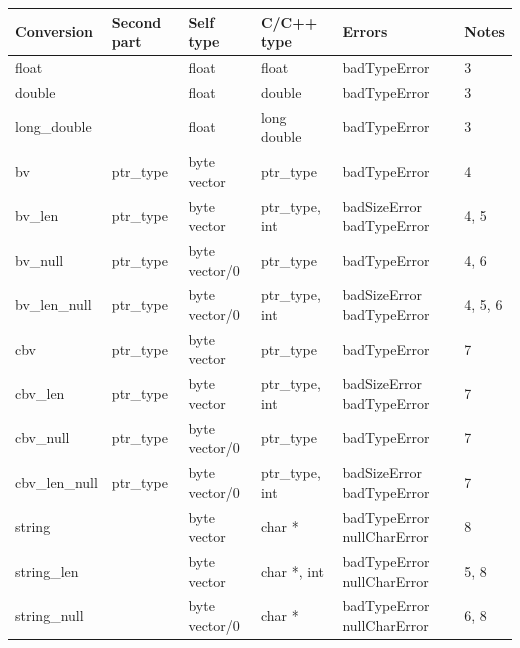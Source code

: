 \documentclass[letterpaper,10pt,english]{sphinxmanual}
\begin{document}
\begin{tabulary}{\linewidth}{p{2cm} p{2cm} p{2cm} p{2cm} p{3cm} p{2cm}}
\hline
\textbf{
Conversion
} & \textbf{
Second part
} & \textbf{
Self type
} & \textbf{
C/C++ type
} & \textbf{
Errors
} & \textbf{
Notes
}\\\hline

float
 &  & 
float
 & 
float
 & 
badTypeError
 & 
3
\\\hline

double
 &  & 
float
 & 
double
 & 
badTypeError
 & 
3
\\\hline

long\_double
 &  & 
float
 & 
long double
 & 
badTypeError
 & 
3
\\\hline

bv
 & 
ptr\_type
 & 
byte vector
 & 
ptr\_type
 & 
badTypeError
 & 
4
\\\hline

bv\_len
 & 
ptr\_type
 & 
byte vector
 & 
ptr\_type, int
 & 
badSizeError badTypeError
 & 
4, 5
\\\hline

bv\_null
 & 
ptr\_type
 & 
byte vector/0
 & 
ptr\_type
 & 
badTypeError
 & 
4, 6
\\\hline

bv\_len\_null
 & 
ptr\_type
 & 
byte vector/0
 & 
ptr\_type, int
 & 
badSizeError badTypeError
 & 
4, 5, 6
\\\hline

cbv
 & 
ptr\_type
 & 
byte vector
 & 
ptr\_type
 & 
badTypeError
 & 
7
\\\hline

cbv\_len
 & 
ptr\_type
 & 
byte vector
 & 
ptr\_type, int
 & 
badSizeError badTypeError
 & 
7
\\\hline

cbv\_null
 & 
ptr\_type
 & 
byte vector/0
 & 
ptr\_type
 & 
badTypeError
 & 
7
\\\hline

cbv\_len\_null
 & 
ptr\_type
 & 
byte vector/0
 & 
ptr\_type, int
 & 
badSizeError badTypeError
 & 
7
\\\hline

string
 &  & 
byte vector
 & 
char *
 & 
badTypeError nullCharError
 & 
8
\\\hline

string\_len
 &  & 
byte vector
 & 
char *, int
 & 
badTypeError nullCharError
 & 
5, 8
\\\hline

string\_null
 &  & 
byte vector/0
 & 
char *
 & 
badTypeError nullCharError
 & 
6, 8
\\\hline


\end{tabulary}
\end{document}
